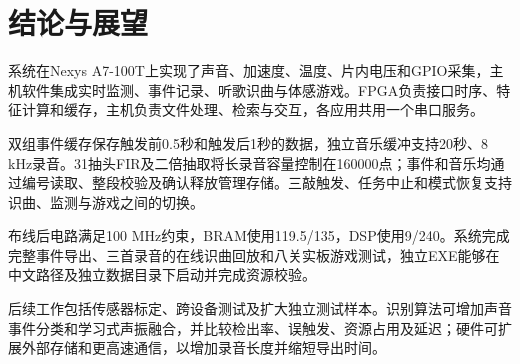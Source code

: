 \chapter{结论与展望}
系统在Nexys A7-100T上实现了声音、加速度、温度、片内电压和GPIO采集，主机软件集成实时监测、事件记录、听歌识曲与体感游戏。FPGA负责接口时序、特征计算和缓存，主机负责文件处理、检索与交互，各应用共用一个串口服务。

双组事件缓存保存触发前0.5秒和触发后1秒的数据，独立音乐缓冲支持20秒、8 kHz录音。31抽头FIR及二倍抽取将长录音容量控制在160000点；事件和音乐均通过编号读取、整段校验及确认释放管理存储。三敲触发、任务中止和模式恢复支持识曲、监测与游戏之间的切换。

布线后电路满足100 MHz约束，BRAM使用119.5/135，DSP使用9/240。系统完成完整事件导出、三首录音的在线识曲回放和八关实板游戏测试，独立EXE能够在中文路径及独立数据目录下启动并完成资源校验。

后续工作包括传感器标定、跨设备测试及扩大独立测试样本。识别算法可增加声音事件分类和学习式声振融合，并比较检出率、误触发、资源占用及延迟；硬件可扩展外部存储和更高速通信，以增加录音长度并缩短导出时间。

